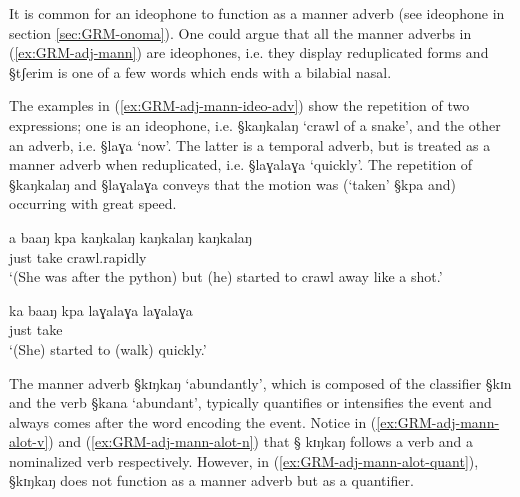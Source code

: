 It is common for an ideophone to function as a manner adverb (see ideophone in
section \ref{sec:GRM-onoma}). One could argue that  all the manner adverbs in
(\ref{ex:GRM-adj-mann}) are ideophones, i.e. they display reduplicated forms
and {\S tʃerim} is one of a few words which ends with a bilabial nasal. 

The
examples in (\ref{ex:GRM-adj-mann-ideo-adv}) show the repetition of two
expressions; one is an ideophone, i.e. {\S kaŋkalaŋ} `crawl of a snake', and the
other an adverb, i.e.  {\S laɣa} `now'.  The latter is a temporal adverb, but is
treated as a manner adverb when reduplicated, i.e. {\S laɣalaɣa} `quickly'. The
repetition of {\S kaŋkalaŋ} and {\S  laɣalaɣa} conveys that the motion was
(`taken' {\S kpa} and) occurring with great speed.


\begin{exe}
\ex\label{ex:GRM-adj-mann-ideo-adv}
\begin{xlist}

\ex\label{ex:GRM-adj-mann-ideo}
\gll a baaŋ kpa {kaŋkalaŋ kaŋkalaŋ kaŋkalaŋ}\\
{\conn} just take crawl.rapidly\\
\glt `(She was after the python) but (he) started to crawl away like a shot.'

\ex\label{ex:GRM-adj-mann-adv}
\gll  ka baaŋ kpa laɣalaɣa laɣalaɣa\\
{\conn} just take {\advm} {\advm}\\
\glt `(She) started to (walk) quickly.'

\end{xlist}
\end{exe}


The manner adverb {\S kɪŋkaŋ} `abundantly',  which is composed of the classifier
{\S kɪn} and the verb {\S kana} `abundant',  typically quantifies or intensifies
the
event and always comes after the word encoding the event.  Notice in
(\ref{ex:GRM-adj-mann-alot-v})  and (\ref{ex:GRM-adj-mann-alot-n})   that {\S
kɪŋkaŋ} follows a verb and a nominalized verb respectively. However, in
(\ref{ex:GRM-adj-mann-alot-quant}), {\S kɪŋkaŋ} does not function as a
manner adverb but as a quantifier.



